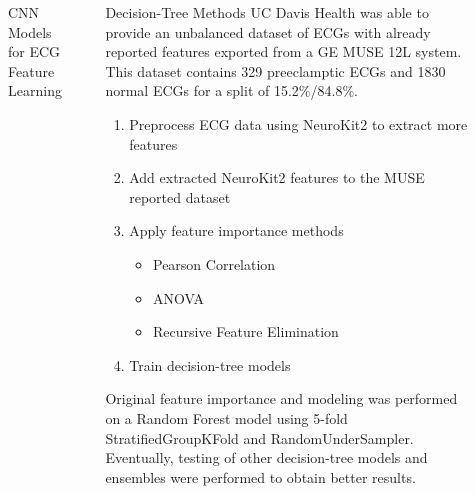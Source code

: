 \documentclass[final]{beamer}
\newlength{\sepwidth}
\newlength{\colwidth}
\newcommand{\separatorcolumn}{\begin{column}{\sepwidth}\end{column}}
\begin{document}
\begin{frame}[t]
\begin{columns}[t]
\begin{column}{\colwidth}

\end{column}

\separatorcolumn

\begin{column}{\colwidth}

  \begin{block}{CNN Models for ECG Feature Learning}
  \end{block}

\end{column}

\separatorcolumn

\begin{column}{\colwidth}

  \begin{block}{Decision-Tree Methods}
    UC Davis Health was able to provide an unbalanced dataset of ECGs with already reported features exported from a GE MUSE 12L system. This dataset contains 329 preeclamptic ECGs and 1830 normal ECGs for a split of 15.2\%/84.8\%.

    \begin{enumerate}
      \item Preprocess ECG data using NeuroKit2 to extract more features
      \item Add extracted NeuroKit2 features to the MUSE reported dataset
      \item Apply feature importance methods
      \begin{itemize}
        \item Pearson Correlation
        \item ANOVA
        \item Recursive Feature Elimination
      \end{itemize}
      \item Train decision-tree models
    \end{enumerate}

    Original feature importance and modeling was performed on a Random Forest model using 5-fold StratifiedGroupKFold and RandomUnderSampler. Eventually, testing of other decision-tree models and ensembles were performed to obtain better results.
  \end{block}


\end{column}
\end{columns}
\end{frame}
\end{document}

